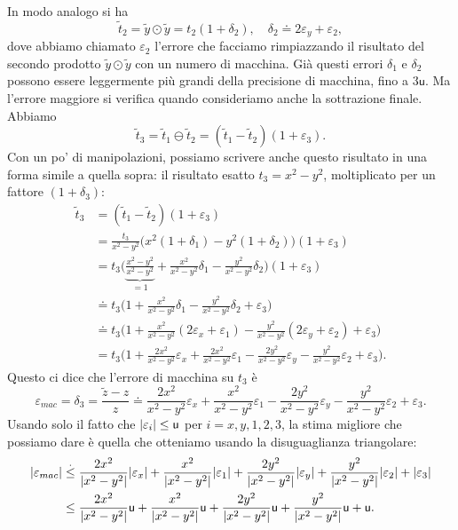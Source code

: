 \documentclass[a4paper]{report}
\DeclarePairedDelimiter{\abs}{\lvert}{\rvert}
\theoremstyle{definition}
\theoremstyle{remark}
\begin{document}
In modo analogo si ha
\[
\tilde{t}_2 = \tilde{y} \odot \tilde{y} = t_2(1+\delta_2), \quad \delta_2 \doteq 2\varepsilon_y + \varepsilon_2,
\]
dove abbiamo chiamato $\varepsilon_2$ l'errore che facciamo rimpiazzando il risultato del secondo prodotto $\tilde{y} \odot \tilde{y}$ con un numero di macchina. Già questi errori $\delta_1$ e $\delta_2$ possono essere leggermente più grandi della precisione di macchina, fino a $3\mathsf{u}$. Ma l'errore maggiore si verifica quando consideriamo anche la sottrazione finale. Abbiamo
\[
\tilde{t}_3 = \tilde{t}_1 \ominus \tilde{t}_2 = (\tilde{t}_1-\tilde{t}_2)(1+\varepsilon_3).
\]
Con un po' di manipolazioni, possiamo scrivere anche questo risultato in una forma simile a quella sopra: il risultato esatto $t_3=x^2-y^2$, moltiplicato per un fattore $(1+\delta_3)$:
\begin{align*}
    \tilde{t}_3&= (\tilde{t}_1-\tilde{t}_2)(1+\varepsilon_3)\\
    &= \frac{t_3}{x^2-y^2}\biggl(x^2(1+\delta_1) - y^2(1+\delta_2)\biggr)(1+\varepsilon_3)\\
    &= t_3 \biggl(\underbrace{\frac{x^2-y^2}{x^2-y^2}}_{=1} + \frac{x^2}{x^2-y^2}\delta_1 - \frac{y^2}{x^2-y^2}\delta_2\biggr)(1+\varepsilon_3)\\
    &\doteq t_3 \biggl(1 + \frac{x^2}{x^2-y^2}\delta_1 - \frac{y^2}{x^2-y^2}\delta_2 +\varepsilon_3\biggr)\\
    &\doteq t_3 \biggl(1 + \frac{x^2}{x^2-y^2}(2\varepsilon_x + \varepsilon_1) - \frac{y^2}{x^2-y^2}(2\varepsilon_y + \varepsilon_2) +\varepsilon_3\biggr)\\
    &= t_3 \biggl(1 + \frac{2x^2}{x^2-y^2}\varepsilon_x + \frac{2x^2}{x^2-y^2}\varepsilon_1 - \frac{2y^2}{x^2-y^2}\varepsilon_y - \frac{y^2}{x^2-y^2}\varepsilon_2 +\varepsilon_3\biggr).
\end{align*}
Questo ci dice che l'errore di macchina su $t_3$ è
\[
\varepsilon_{mac} = \delta_3 = \frac{\tilde{z} - z}{z} \doteq \frac{2x^2}{x^2-y^2}\varepsilon_x + \frac{x^2}{x^2-y^2}\varepsilon_1 - \frac{2y^2}{x^2-y^2}\varepsilon_y - \frac{y^2}{x^2-y^2}\varepsilon_2 +\varepsilon_3.
\]
Usando solo il fatto che $\abs{\varepsilon_i} \leq \mathsf{u}$ per $i=x,y,1,2,3$, la stima migliore che possiamo dare è quella che otteniamo usando la disuguaglianza triangolare:
\begin{align}
    \abs{\varepsilon_{mac}} &\stackrel{.}{\leq} \frac{2x^2}{\abs{x^2-y^2}} \abs{\varepsilon_x} + \frac{x^2}{\abs{x^2-y^2}}\abs{\varepsilon_1} + \frac{2y^2}{\abs{x^2-y^2}} \abs{\varepsilon_y} + \frac{y^2}{\abs{x^2-y^2}} \abs{\varepsilon_2} + \abs{\varepsilon_3} \nonumber\\
    &\leq \frac{2x^2}{\abs{x^2-y^2}} \mathsf{u} + \frac{x^2}{\abs{x^2-y^2}} \mathsf{u} + \frac{2y^2}{\abs{x^2-y^2}} \mathsf{u} + \frac{y^2}{\abs{x^2-y^2}} \mathsf{u} + \mathsf{u}. \label{esempiox2y2}
\end{align}
\end{document}
